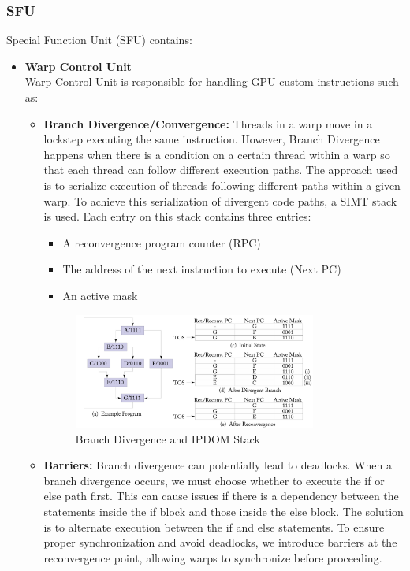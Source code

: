 \documentclass[12pt]{report}
\begin{document}
\subsubsection{SFU} 
Special Function Unit (SFU) contains:
\begin{itemize}
    \item \textbf{Warp Control Unit} \\
        Warp Control Unit is responsible for handling GPU custom instructions such as:
        \begin{itemize}
            \item \textbf{Branch Divergence/Convergence:} Threads in a warp move in a lockstep executing the same instruction. However, Branch Divergence happens when there is a condition on a certain thread within a warp so that each thread can follow different execution paths. The approach used is to serialize execution of threads following different paths within a given warp. To achieve this serialization of divergent code paths, a SIMT stack is used. Each entry on this stack contains three entries:
                \begin{itemize}
                    \item A reconvergence program counter (RPC)
                    \item The address of the next instruction to execute (Next PC)
                    \item An active mask
                \end{itemize}
                \begin{figure}[H]
                    \centering
                    \includegraphics[width=0.8\textwidth]{./figures/simt-stack.png}
                    \caption{Branch Divergence and IPDOM Stack}
                \end{figure}
            \item \textbf{Barriers:} Branch divergence can potentially lead to deadlocks. When a branch divergence occurs, we must choose whether to execute the if or else path first. This can cause issues if there is a dependency between the statements inside the if block and those inside the else block. The solution is to alternate execution between the if and else statements. To ensure proper synchronization and avoid deadlocks, we introduce barriers at the reconvergence point, allowing warps to synchronize before proceeding.

\end{itemize}
\end{itemize}
\end{document}
